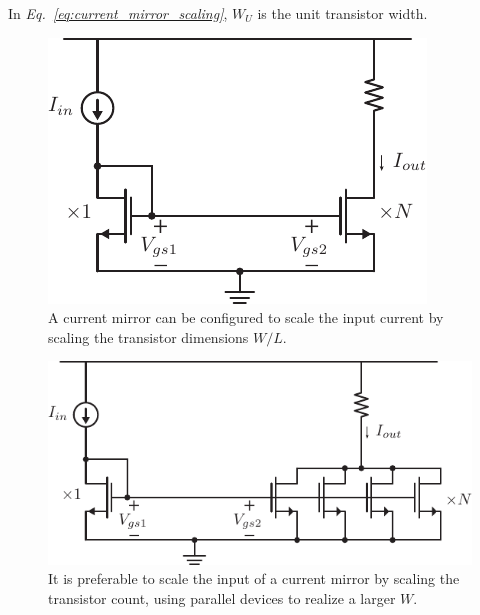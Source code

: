 In \emph{Eq.~\ref{eq:current_mirror_scaling}}, $W_U$ is the unit transistor width.
\vspace{0.5cm}
\begin{figure}[H]
\centering
\includegraphics[scale=1.5]{6mirror_105_amp.pdf}
\caption{A current mirror can be configured to scale the input current by scaling the transistor dimensions $W/L$.}
\label{fig:mirror_amp}
\end{figure}
\newpage
\begin{figure}[t]
\centering
\includegraphics[scale=1.5]{6mirror_105_amp_Ncopies.pdf}
\caption{It is preferable to scale the input of a current mirror by scaling the transistor count, using parallel devices to realize a larger $W$.}
\label{fig:mirror_amp_n_copies}
\end{figure}
